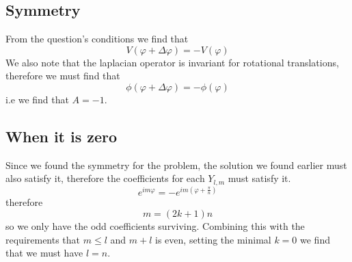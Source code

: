 \subsection{Symmetry}
From the question's conditions we find that
\begin{equation}
  V(\varphi+\Delta\varphi)=-V(\varphi)
\end{equation}
We also note that the laplacian operator is invariant for rotational translations, therefore we must find that
\begin{equation}
  \phi(\varphi+\Delta\varphi)=-\phi(\varphi)
\end{equation}
i.e we find that \(A=-1\).
\subsection{When it is zero}
Since we found the symmetry for the problem, the solution we found earlier must also satisfy it, therefore the coefficients for each \(Y_{l,m}\) must satisfy it.
\begin{equation}
  e^{im\varphi}=-e^{im(\varphi+\frac{\pi}{n})}
\end{equation}
therefore
\begin{equation}
  m=(2k+1)n
\end{equation}
so we only have the odd coefficients surviving. Combining this with the requirements that \(m\leq l\) and \(m+l\) is even, setting the minimal \(k=0\) we find that we must have \(l=n\).